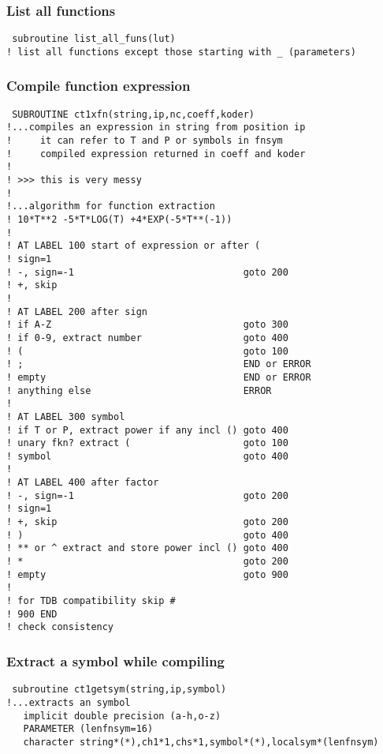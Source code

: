\documentclass[12pt]{article}
\begin{document}
\subsubsection{List all functions}

\begin{verbatim}
 subroutine list_all_funs(lut)
! list all functions except those starting with _ (parameters)
\end{verbatim}

\subsubsection{Compile function expression}

\begin{verbatim}
 SUBROUTINE ct1xfn(string,ip,nc,coeff,koder)
!...compiles an expression in string from position ip
!     it can refer to T and P or symbols in fnsym
!     compiled expression returned in coeff and koder
!
! >>> this is very messy
!
!...algorithm for function extraction
! 10*T**2 -5*T*LOG(T) +4*EXP(-5*T**(-1))
!
! AT LABEL 100 start of expression or after (
! sign=1
! -, sign=-1                              goto 200
! +, skip
!
! AT LABEL 200 after sign
! if A-Z                                  goto 300
! if 0-9, extract number                  goto 400
! (                                       goto 100
! ;                                       END or ERROR
! empty                                   END or ERROR
! anything else                           ERROR
!
! AT LABEL 300 symbol
! if T or P, extract power if any incl () goto 400
! unary fkn? extract (                    goto 100
! symbol                                  goto 400
!
! AT LABEL 400 after factor
! -, sign=-1                              goto 200
! sign=1
! +, skip                                 goto 200
! )                                       goto 400
! ** or ^ extract and store power incl () goto 400
! *                                       goto 200
! empty                                   goto 900
!
! for TDB compatibility skip #
! 900 END
! check consistency
\end{verbatim}

\subsubsection{Extract a symbol while compiling}

\begin{verbatim}
 subroutine ct1getsym(string,ip,symbol)
!...extracts an symbol
   implicit double precision (a-h,o-z)
   PARAMETER (lenfnsym=16)
   character string*(*),ch1*1,chs*1,symbol*(*),localsym*(lenfnsym)
\end{verbatim}
\end{document}
